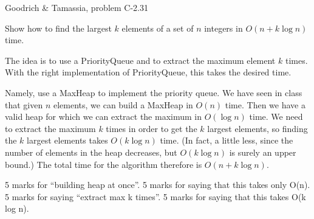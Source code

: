 \begin{authorship}
Goodrich \& Tamassia, problem C-2.31
\end{authorship}
\begin{usage}
\end{usage}

Show how to find the largest $k$ elements of a set of $n$
integers in $O(n+k\log n)$ time.

\begin{solution}
The idea is to use a PriorityQueue and to extract the maximum element $k$
times.  With the right implementation of PriorityQueue, this takes the
desired time.

Namely, use a MaxHeap to implement the priority queue.  We have seen in
class that given $n$ elements, we can build a MaxHeap in $O(n)$ time.
Then we have a valid heap for which we can extract the maximum in
$O(\log n)$ time.  We need to extract the maximum $k$ times in order to
get the $k$ largest elements, so finding the $k$ largest elements takes
$O(k\log n)$ time.  (In fact, a little less, since the number of elements
in the heap decreases, but $O(k\log n)$ is surely an upper bound.)
The total time for the algorithm therefore is $O(n+k\log n)$.
\end{solution}

\begin{markingScheme}
5 marks for ``building heap at once''.
5 marks for saying that this takes only O(n).
5 marks for saying ``extract max k times''.
5 marks for saying that this takes O(k log n).
\end{markingScheme}
